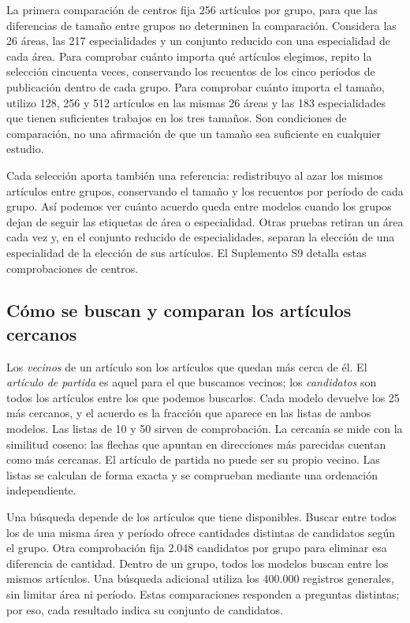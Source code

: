 \documentclass[12pt]{article}
\begin{document}
La primera comparación de centros fija 256 artículos por grupo, para que las diferencias de tamaño entre grupos no determinen la comparación. Considera las 26 áreas, las 217 especialidades y un conjunto reducido con una especialidad de cada área. Para comprobar cuánto importa qué artículos elegimos, repito la selección cincuenta veces, conservando los recuentos de los cinco períodos de publicación dentro de cada grupo. Para comprobar cuánto importa el tamaño, utilizo 128, 256 y 512 artículos en las mismas 26 áreas y las 183 especialidades que tienen suficientes trabajos en los tres tamaños. Son condiciones de comparación, no una afirmación de que un tamaño sea suficiente en cualquier estudio.

Cada selección aporta también una referencia: redistribuyo al azar los mismos artículos entre grupos, conservando el tamaño y los recuentos por período de cada grupo. Así podemos ver cuánto acuerdo queda entre modelos cuando los grupos dejan de seguir las etiquetas de área o especialidad. Otras pruebas retiran un área cada vez y, en el conjunto reducido de especialidades, separan la elección de una especialidad de la elección de sus artículos. El Suplemento S9 detalla estas comprobaciones de centros.

\subsection{Cómo se buscan y comparan los artículos cercanos}
Los \emph{vecinos} de un artículo son los artículos que quedan más cerca de él. El \emph{artículo de partida} es aquel para el que buscamos vecinos; los \emph{candidatos} son todos los artículos entre los que podemos buscarlos. Cada modelo devuelve los 25 más cercanos, y el acuerdo es la fracción que aparece en las listas de ambos modelos. Las listas de 10 y 50 sirven de comprobación. La cercanía se mide con la similitud coseno: las flechas que apuntan en direcciones más parecidas cuentan como más cercanas. El artículo de partida no puede ser su propio vecino. Las listas se calculan de forma exacta y se comprueban mediante una ordenación independiente.

Una búsqueda depende de los artículos que tiene disponibles. Buscar entre todos los de una misma área y período ofrece cantidades distintas de candidatos según el grupo. Otra comprobación fija 2.048 candidatos por grupo para eliminar esa diferencia de cantidad. Dentro de un grupo, todos los modelos buscan entre los mismos artículos. Una búsqueda adicional utiliza los 400.000 registros generales, sin limitar área ni período. Estas comparaciones responden a preguntas distintas; por eso, cada resultado indica su conjunto de candidatos.
\end{document}
